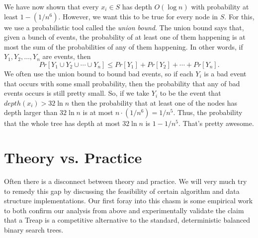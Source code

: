 \documentclass[11pt]{article}
\begin{document}
We have now shown that every $x_{i} \in S$ has depth $O(\log n)$ with probability at least $1-(1/n^{6})$.  However, we want this to be true for every node in $S$.  For this, we use a probabilistic tool called the {\em union bound}.  The union bound says that, given a bunch of events, the probability of at least one of them happening is at most the sum of the probabilities of any of them happening.  In other words, if $Y_{1}, Y_{2}, \ldots, Y_{n}$ are events, then
\[
Pr[Y_{1} \cup Y_{2} \cup \cdots \cup Y_{n}] \leq Pr[Y_{1}] + Pr[Y_{2}] + \cdots + Pr[Y_{n}].
\]
We often use the union bound to bound bad events, so if each $Y_{i}$ is a bad event that occurs with some small probability, then the probability that any of bad events occurs is still pretty small.  So, if we take $Y_{i}$ to be the event that $depth(x_{i}) > 32 \ln n$ then the probability that at least one of the nodes has depth larger than $32 \ln n$ is at most $n \cdot (1/ n^{6})= 1/n^{5}$.  Thus, the probability that the whole tree has depth at most $32 \ln n$ is $1-1/n^{5}$.  That's pretty awesome.


\section{Theory vs. Practice}

Often there is a disconnect between theory and practice.  We will very much try to remedy this gap by discussing the feasibility of certain algorithm and data structure implementations.  Our first foray into this chasm is some empirical work to both confirm our analysis from above and experimentally validate the claim that a Treap is a competitive alternative to the standard, deterministic balanced binary search trees.
\end{document}

